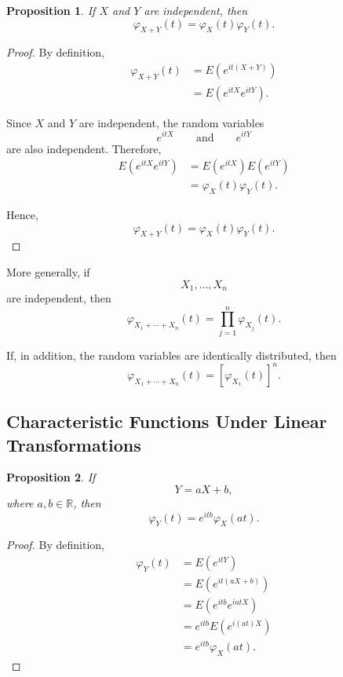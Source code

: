 \documentclass[11pt]{article}
\theoremstyle{definition}
\theoremstyle{plain}
\newtheorem{proposition}{Proposition}
\theoremstyle{remark}
\begin{document}
\begin{proposition}
If $X$ and $Y$ are independent, then
\[
\varphi_{X+Y}(t)
=
\varphi_X(t)\varphi_Y(t).
\]
\end{proposition}

\begin{proof}
By definition,
\begin{align*}
\varphi_{X+Y}(t)
&=
E\left(e^{it(X+Y)}\right)
\\
&=
E\left(e^{itX}e^{itY}\right).
\end{align*}

Since $X$ and $Y$ are independent, the random variables
\[
e^{itX}
\qquad\text{and}\qquad
e^{itY}
\]
are also independent. Therefore,
\begin{align*}
E\left(e^{itX}e^{itY}\right)
&=
E(e^{itX})E(e^{itY})
\\
&=
\varphi_X(t)\varphi_Y(t).
\end{align*}

Hence,
\[
\varphi_{X+Y}(t)
=
\varphi_X(t)\varphi_Y(t).
\]
\end{proof}

More generally, if
\[
X_1,\ldots,X_n
\]
are independent, then
\[
\varphi_{X_1+\cdots+X_n}(t)
=
\prod_{j=1}^n\varphi_{X_j}(t).
\]

If, in addition, the random variables are identically distributed, then
\[
\varphi_{X_1+\cdots+X_n}(t)
=
[\varphi_{X_1}(t)]^n.
\]


\subsection*{Characteristic Functions Under Linear Transformations}

\begin{proposition}
If
\[
Y=aX+b,
\]
where $a,b\in\mathbb{R}$, then
\[
\varphi_Y(t)
=
e^{itb}\varphi_X(at).
\]
\end{proposition}

\begin{proof}
By definition,
\begin{align*}
\varphi_Y(t)
&=
E(e^{itY})
\\
&=
E(e^{it(aX+b)})
\\
&=
E(e^{itb}e^{iatX})
\\
&=
e^{itb}E(e^{i(at)X})
\\
&=
e^{itb}\varphi_X(at).
\end{align*}
\end{proof}
\end{document}
